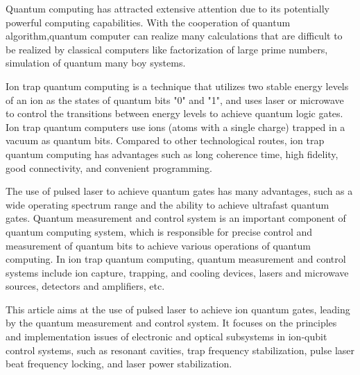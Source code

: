 \begin{abstract*}
  Quantum computing has attracted extensive attention due to its potentially powerful computing capabilities. With the cooperation of quantum algorithm,quantum computer can realize many calculations that are difficult to be realized by classical computers like factorization of large prime numbers, simulation of quantum many boy systems. 


  Ion trap quantum computing is a technique that utilizes two stable energy levels of an ion as the states of quantum bits "0" and "1", and uses laser or microwave to control the transitions between energy levels to achieve quantum logic gates. Ion trap quantum computers use ions (atoms with a single charge) trapped in a vacuum as quantum bits. Compared to other technological routes, ion trap quantum computing has advantages such as long coherence time, high fidelity, good connectivity, and convenient programming.

  The use of pulsed laser to achieve quantum gates has many advantages, such as a wide operating spectrum range and the ability to achieve ultrafast quantum gates. Quantum measurement and control system is an important component of quantum computing system, which is responsible for precise control and measurement of quantum bits to achieve various operations of quantum computing. In ion trap quantum computing, quantum measurement and control systems include ion capture, trapping, and cooling devices, lasers and microwave sources, detectors and amplifiers, etc.

  This article aims at the use of pulsed laser to achieve ion quantum gates, leading by the quantum measurement and control system. It focuses on the principles and implementation issues of electronic and optical subsystems in ion-qubit control systems, such as resonant cavities, trap frequency stabilization, pulse laser beat frequency locking, and laser power stabilization.

\end{abstract*}
